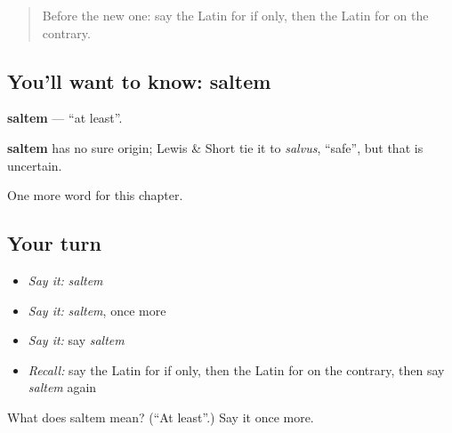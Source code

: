 \begin{quote}
Before the new one: say the Latin for if only, then the Latin for on the contrary.
\end{quote}

\subsection*{You'll want to know: saltem}
\textbf{saltem} — \textquotedblleft{}at least\textquotedblright{}.

\begin{cousinweb}
\textbf{saltem} has no sure origin; Lewis \& Short tie it to \emph{salvus}, \textquotedblleft{}safe\textquotedblright{}, but that is uncertain.
\end{cousinweb}

\begin{grammarlens}[title={What you've built}]
One more word for this chapter.
\end{grammarlens}

\subsection*{Your turn}
\begin{itemize}
\raggedright
  \item \emph{Say it:} \emph{saltem}
  \item \emph{Say it:} \emph{saltem}, once more
  \item \emph{Say it:} say \emph{saltem}
  \item \emph{Recall:} say the Latin for if only, then the Latin for on the contrary, then say \emph{saltem} again
\end{itemize}

\begin{tcolorbox}[breakable,colback=teal!4,colframe=teal!35!black,title={Before you move on}]
What does saltem mean? (\textquotedblleft{}At least\textquotedblright{}.) Say it once more.
\end{tcolorbox}

